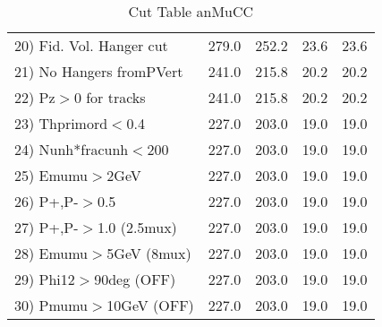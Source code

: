 \begin{table}[h!]
\begin{tabular}{||l||r|r|r|r||}
 20) Fid. Vol. Hanger cut &       279.0 &       252.2 &        23.6 &        23.6 \\
 21) No Hangers fromPVert &       241.0 &       215.8 &        20.2 &        20.2 \\
 22) Pz$>$0 for tracks    &       241.0 &       215.8 &        20.2 &        20.2 \\
 23) Thprimord$<$0.4      &       227.0 &       203.0 &        19.0 &        19.0 \\
 24) Nunh*fracunh$<$200   &       227.0 &       203.0 &        19.0 &        19.0 \\
 25) Emumu$>$2GeV         &       227.0 &       203.0 &        19.0 &        19.0 \\
 26) P+,P-$>$0.5          &       227.0 &       203.0 &        19.0 &        19.0 \\
 27) P+,P-$>$1.0 (2.5mux) &       227.0 &       203.0 &        19.0 &        19.0 \\
 28) Emumu$>$5GeV  (8mux) &       227.0 &       203.0 &        19.0 &        19.0 \\
 29) Phi12$>$90deg  (OFF) &       227.0 &       203.0 &        19.0 &        19.0 \\
 30) Pmumu$>$10GeV  (OFF) &       227.0 &       203.0 &        19.0 &        19.0 \\
 \hline
 \hline
 \end{tabular}
 \caption{Cut Table  anMuCC }
 \label{tab-cut_anmcc}
 \end{table}
